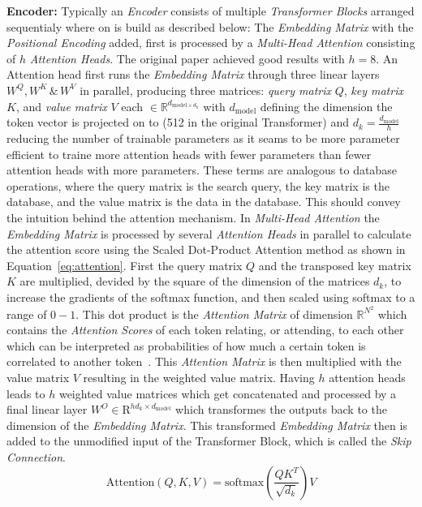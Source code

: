 \textbf{Encoder:} Typically an \emph{Encoder} consists of multiple \emph{Transformer Blocks} arranged sequentialy where on is build as described below: The \emph{Embedding Matrix} with the \emph{Positional Encoding} added, first is processed by a \emph{Multi-Head Attention} consisting of $h$ \emph{Attention Heads}.
The original paper achieved good results with $h=8$.
An Attention head first runs the \emph{Embedding Matrix} through three linear layers $W^Q, W^K\, \&\, W^V$ in parallel, producing three matrices: \emph{query matrix} $Q$, \emph{key matrix} $K$, and \emph{value matrix} $V$ each $\in \mathbb{R}^{d_{\text{model}\times d_k}}$ with $d_{\text{model}}$ defining the dimension the token vector is projected on to (512 in the original Transformer) and $d_k = \frac{d_{\text{model}}}{h}$ reducing the number of trainable parameters as it seams to be more parameter efficient to traine more attention heads with fewer parameters than fewer attention heads with more parameters.
These terms are analogous to database operations, where the query matrix is the search query, the key matrix is the database, and the value matrix is the data in the database.
This should convey the intuition behind the attention mechanism.
In \emph{Multi-Head Attention} the \emph{Embedding Matrix} is processed by several \emph{Attention Heads} in parallel to calculate the attention score using the Scaled Dot-Product Attention method as shown in Equation~\ref{eq:attention}. 
First the query matrix $Q$ and the transposed key matrix $K$ are multiplied, devided by the square of the dimension of the matrices $d_k$, to increase the gradients of the softmax function, and then scaled using softmax to a range of $0-1$.
This dot product is the \emph{Attention Matrix} of dimension $\mathbb{R}^{N^2}$ which contains the \emph{Attention Scores} of each token relating, or attending, to each other which can be interpreted as probabilities of how much a certain token is correlated to another token~\cite{Han2023}. 
This \emph{Attention Matrix} is then multiplied with the value matrix $V$ resulting in the weighted value matrix.
Having $h$ attention heads leads to $h$ weighted value matrices which get concatenated and processed by a final linear layer $W^O \in \mathrm{R}^{hd_k \times d_{\text{model}}}$ which transformes the outputs back to the dimension of the \emph{Embedding Matrix}.
This transformed \emph{Embedding Matrix} then is added to the unmodified input of the Transformer Block, which is called the \emph{Skip Connection}.     
\begin{equation}
    \text{Attention}(Q, K, V) = \text{softmax}\left(\frac{QK^{T}}{\sqrt{d_{k}}}\right)V
    \label{eq:attention}
\end{equation}

